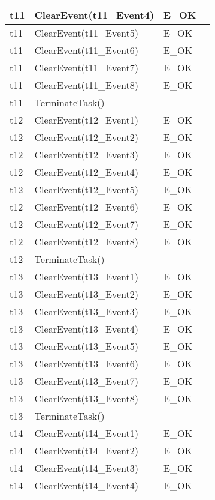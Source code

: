 \documentclass[10pt]{article}
\newlength{\Li}\settowidth{\Li}{Running}
\newlength{\Lii}\setlength{\Lii}{7cm}
\newlength{\Liiii}\setlength{\Liiii}{0.9cm}
\newlength{\Liii}\setlength{\Liii}{\textwidth} \addtolength{\Liii}{-\Li} \addtolength{\Liii}{-\Lii} \addtolength{\Liii}{-\Liiii}
\begin{document}
\begin{supertabular}{|p{\Li}|p{\Lii}|p{\Liii}|p{\Liiii}|}
	t11	& ClearEvent(t11\_Event4)		& E\_OK				& \\ \hline 
	t11	& ClearEvent(t11\_Event5)		& E\_OK				& \\ \hline 
	t11	& ClearEvent(t11\_Event6)		& E\_OK				& \\ \hline 
	t11	& ClearEvent(t11\_Event7)		& E\_OK				& \\ \hline 
	t11	& ClearEvent(t11\_Event8)		& E\_OK				& \\ \hline 
	t11	& TerminateTask()				&					&  \\ \hline
	t12	& ClearEvent(t12\_Event1)		& E\_OK				& \\ \hline 
	t12	& ClearEvent(t12\_Event2)		& E\_OK				& \\ \hline 
	t12	& ClearEvent(t12\_Event3)		& E\_OK				& \\ \hline 
	t12	& ClearEvent(t12\_Event4)		& E\_OK				& \\ \hline 
	t12	& ClearEvent(t12\_Event5)		& E\_OK				& \\ \hline 
	t12	& ClearEvent(t12\_Event6)		& E\_OK				& \\ \hline 
	t12	& ClearEvent(t12\_Event7)		& E\_OK				& \\ \hline 
	t12	& ClearEvent(t12\_Event8)		& E\_OK				& \\ \hline 
	t12	& TerminateTask()				&					&  \\ \hline
	t13	& ClearEvent(t13\_Event1)		& E\_OK				& \\ \hline 
	t13	& ClearEvent(t13\_Event2)		& E\_OK				& \\ \hline 
	t13	& ClearEvent(t13\_Event3)		& E\_OK				& \\ \hline 
	t13	& ClearEvent(t13\_Event4)		& E\_OK				& \\ \hline 
	t13	& ClearEvent(t13\_Event5)		& E\_OK				& \\ \hline 
	t13	& ClearEvent(t13\_Event6)		& E\_OK				& \\ \hline 
	t13	& ClearEvent(t13\_Event7)		& E\_OK				& \\ \hline 
	t13	& ClearEvent(t13\_Event8)		& E\_OK				& \\ \hline 
	t13	& TerminateTask()				&					&  \\ \hline
	t14	& ClearEvent(t14\_Event1)		& E\_OK				& \\ \hline 
	t14	& ClearEvent(t14\_Event2)		& E\_OK				& \\ \hline 
	t14	& ClearEvent(t14\_Event3)		& E\_OK				& \\ \hline 
	t14	& ClearEvent(t14\_Event4)		& E\_OK				& \\ \hline 

\end{supertabular}
\end{document}
